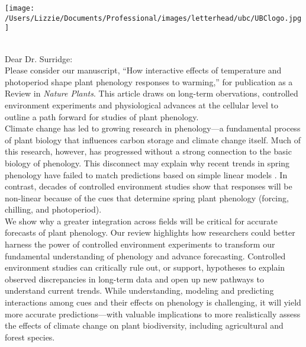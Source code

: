\documentclass[11pt,a4paper]{article}
\begin{document}
\renewcommand{\refname}{\CHead{}}
    \begin{flushright}
\texttt{[image: /Users/Lizzie/Documents/Professional/images/letterhead/ubc/UBClogo.jpg]}
    \end{flushright}

\vspace{1.5ex}\\
Dear Dr. Surridge:
\vspace{1.5ex}\\
Please consider our manuscript, ``How interactive effects of temperature and photoperiod shape plant phenology responses to warming,'' for publication as a Review in \emph{Nature Plants}. This article draws on long-term obervations, controlled environment experiments and physiological advances at the cellular level to outline a path forward for studies of plant phenology. 
\vspace{1.5ex}\\
Climate change has led to growing research in phenology---a fundamental process of plant biology that influences carbon storage and climate change itself. Much of this research, however, has progressed without a strong connection to the basic biology of phenology. This disconnect may explain why recent trends in spring phenology have failed to match predictions based on simple linear models \citep{fu2015,piao2017}. In contrast, decades of controlled environment studies show that responses will be non-linear because of the cues that determine spring plant phenology (forcing, chilling, and photoperiod).
\vspace{1.5ex}\\
We show why a greater integration across fields will be critical for accurate forecasts of plant phenology. Our review highlights how researchers could better harness the power of controlled environment experiments to transform our fundamental understanding of phenology and advance forecasting. Controlled environment studies can critically rule out, or support, hypotheses to explain observed discrepancies in long-term data and open up new pathways to understand current trends. While understanding, modeling and predicting interactions among cues and their effects on phenology is challenging, it will yield more accurate predictions---with valuable implications to more realistically assess the effects of climate change on plant biodiversity, including agricultural and forest species. 
\end{document}
